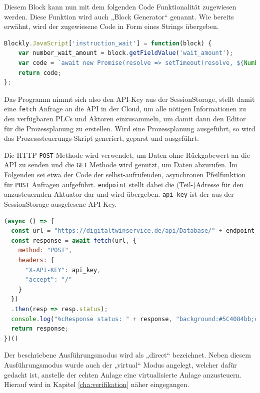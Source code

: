 Diesem Block kann nun mit dem folgenden Code Funktionalität zugewiesen werden. Diese Funktion wird auch „Block Generator“ genannt. Wie bereits erwähnt, wird der zugewiesene Code in Form eines Strings übergeben.

\begin{lstlisting}[language=JavaScript]
Blockly.JavaScript['instruction_wait'] = function(block) {
	var number_wait_amount = block.getFieldValue('wait_amount');
	var code = `await new Promise(resolve => setTimeout(resolve, ${Number(number_wait_amount) * 1000}));\n`;
	return code;
};
\end{lstlisting}

Das Programm nimmt sich also den API-Key aus der SessionStorage, stellt damit eine \verb|fetch| Anfrage an die API in der Cloud, um alle nötigen Informationen zu den verfügbaren PLCs und Aktoren einzusammeln, um damit dann den Editor für die Prozessplanung zu erstellen. Wird eine Prozessplanung ausgeführt, so wird das Prozesssteuerungs-Skript generiert, geparst und ausgeführt.

Die HTTP \verb|POST| Methode wird verwendet, um Daten ohne Rückgabewert an die API zu senden und die \verb|GET| Methode wird genutzt, um Daten abzurufen. Im Folgenden sei etwa der Code der selbst-aufrufenden, asynchronen Pfeilfunktion für \verb|POST| Anfragen aufgeführt. \verb|endpoint| stellt dabei die (Teil-)Adresse für den anzusteuernden Aktuator dar und wird übergeben. \verb|api_key| ist der aus der SessionStorage ausgelesene API-Key.

\begin{lstlisting}[language=JavaScript]
(async () => {
  const url = "https://digitaltwinservice.de/api/Database/" + endpoint;
  const response = await fetch(url, {
    method: "POST",
    headers: {
      "X-API-KEY": api_key,
      "accept": "/"
    }
  })
  .then(resp => resp.status);
  console.log("%cResponse status: " + response, "background:#5C4084bb;color:white;padding:1px 4px 1px 16px;border-radius:2px;");
  return response;
})()
\end{lstlisting}

Der beschriebene Ausführungsmodus wird als „direct“ bezeichnet. Neben diesem Ausführungsmodus wurde auch der „virtual“ Modus angelegt, welcher dafür gedacht ist, anstelle der echten Anlage eine virtualisierte Anlage anzusteuern. Hierauf wird in Kapitel \ref{cha:verifikation} näher eingegangen.

